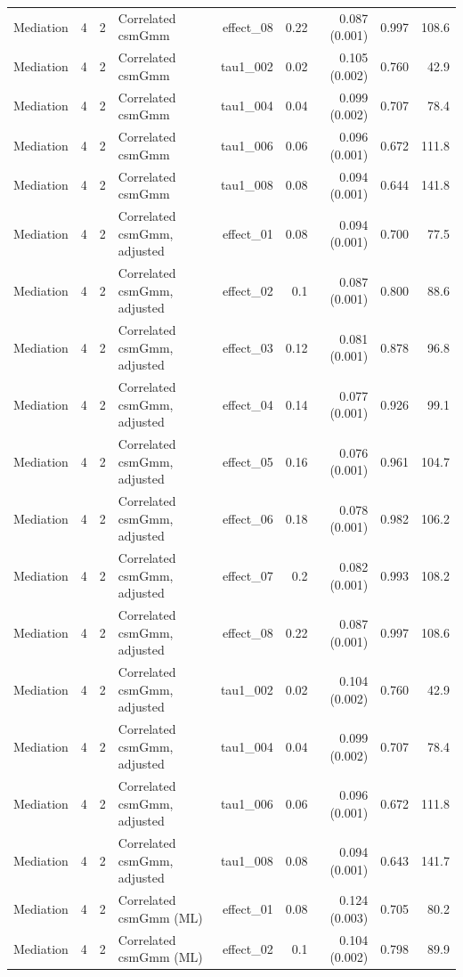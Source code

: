 \begin{longtable}{lcclrrrrr}
Mediation & 4 & 2 & Correlated csmGmm & effect\_08 & 0.22 & 0.087 (0.001) & 0.997 & 108.6\\
Mediation & 4 & 2 & Correlated csmGmm & tau1\_002 & 0.02 & 0.105 (0.002) & 0.760 & 42.9\\
Mediation & 4 & 2 & Correlated csmGmm & tau1\_004 & 0.04 & 0.099 (0.002) & 0.707 & 78.4\\
Mediation & 4 & 2 & Correlated csmGmm & tau1\_006 & 0.06 & 0.096 (0.001) & 0.672 & 111.8\\
Mediation & 4 & 2 & Correlated csmGmm & tau1\_008 & 0.08 & 0.094 (0.001) & 0.644 & 141.8\\
Mediation & 4 & 2 & Correlated csmGmm, adjusted & effect\_01 & 0.08 & 0.094 (0.001) & 0.700 & 77.5\\
Mediation & 4 & 2 & Correlated csmGmm, adjusted & effect\_02 & 0.1 & 0.087 (0.001) & 0.800 & 88.6\\
Mediation & 4 & 2 & Correlated csmGmm, adjusted & effect\_03 & 0.12 & 0.081 (0.001) & 0.878 & 96.8\\
Mediation & 4 & 2 & Correlated csmGmm, adjusted & effect\_04 & 0.14 & 0.077 (0.001) & 0.926 & 99.1\\
Mediation & 4 & 2 & Correlated csmGmm, adjusted & effect\_05 & 0.16 & 0.076 (0.001) & 0.961 & 104.7\\
Mediation & 4 & 2 & Correlated csmGmm, adjusted & effect\_06 & 0.18 & 0.078 (0.001) & 0.982 & 106.2\\
Mediation & 4 & 2 & Correlated csmGmm, adjusted & effect\_07 & 0.2 & 0.082 (0.001) & 0.993 & 108.2\\
Mediation & 4 & 2 & Correlated csmGmm, adjusted & effect\_08 & 0.22 & 0.087 (0.001) & 0.997 & 108.6\\
Mediation & 4 & 2 & Correlated csmGmm, adjusted & tau1\_002 & 0.02 & 0.104 (0.002) & 0.760 & 42.9\\
Mediation & 4 & 2 & Correlated csmGmm, adjusted & tau1\_004 & 0.04 & 0.099 (0.002) & 0.707 & 78.4\\
Mediation & 4 & 2 & Correlated csmGmm, adjusted & tau1\_006 & 0.06 & 0.096 (0.001) & 0.672 & 111.8\\
Mediation & 4 & 2 & Correlated csmGmm, adjusted & tau1\_008 & 0.08 & 0.094 (0.001) & 0.643 & 141.7\\
Mediation & 4 & 2 & Correlated csmGmm (ML) & effect\_01 & 0.08 & 0.124 (0.003) & 0.705 & 80.2\\
Mediation & 4 & 2 & Correlated csmGmm (ML) & effect\_02 & 0.1 & 0.104 (0.002) & 0.798 & 89.9\\

\end{longtable}
